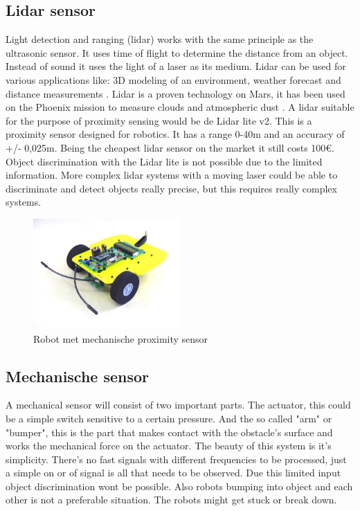 \documentclass[10pt,a4paper]{article}
\begin{document}
\subsection{Lidar sensor}
Light detection and ranging (lidar) works with the same principle as the ultrasonic sensor. It uses time of flight to determine the distance from an object. Instead of sound it uses the light of a laser as its medium. Lidar can be used for various applications like: 3D modeling of an environment, weather forecast and distance measurements \cite{whatlidar}. Lidar is a proven technology on Mars, it has been used on the Phoenix mission to measure clouds and atmospheric dust \cite{lidarmars}. A lidar suitable for the purpose of proximity sensing would be de Lidar lite v2. This is a proximity sensor designed for robotics. It has a range 0-40m and an accuracy of +/- 0,025m. Being the cheapest lidar sensor on the market it still costs 100\euro. Object discrimination with the Lidar lite is not possible due to the limited information. More complex lidar systems with a moving laser could be able to discriminate and detect objects really precise, but this requires really complex systems.


\begin{figure}[!ht]

  \centering
      \includegraphics[width=0.5\textwidth]{voelsprieten.jpg}
  \caption{Robot met mechanische proximity sensor}  \label{voelspriet}
 
\end{figure}

\subsection{Mechanische sensor}
A mechanical sensor will consist of two important parts. The actuator, this could be a simple switch sensitive to a certain pressure. And the so called "arm" or "bumper", this is the part that makes contact with the obstacle's surface and works the mechanical force on the actuator. The beauty of this system is it's simplicity. There's no fast signals with different frequencies to be processed, just a simple on or of signal is all that needs to be observed. Due this limited input object discrimination wont be possible. Also robots bumping into object and each other is not a preferable situation. The robots might get stuck or break down.
\end{document}
